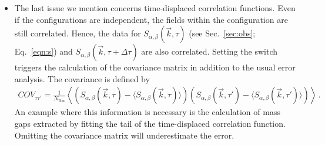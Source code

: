 \begin{itemize}
	\item The last issue we mention concerns time-displaced correlation functions. Even if the configurations are independent, the fields within the configuration are still correlated. Hence, the data for $S_{\alpha,\beta}(\vec{k},\tau)$ (see Sec.~\ref{sec:obs}; Eq.~\eqref{eqn:s}) and $S_{\alpha,\beta}(\vec{k},\tau+\Delta\tau)$ are also correlated. Setting the switch  triggers the calculation of the covariance matrix in addition to the usual error analysis. The covariance is defined by
	\begin{align}
		COV_{\tau\tau'}=\frac{1}{N_{\text{Bin}}}\left\langle
		\left( S_{\alpha,\beta}(\vec{k},\tau) - \big\langle S_{\alpha,\beta}(\vec{k},\tau)\big\rangle \right)
		\left(S_{\alpha,\beta}(\vec{k},\tau')-\big\langle S_{\alpha,\beta}(\vec{k},\tau')\big\rangle \right)  \right\rangle\,.
	\end{align}
An example where this information is necessary is the  calculation of mass gaps extracted by fitting the  tail  of the time-displaced correlation function.  Omitting  the covariance matrix will  underestimate the  error.
\end{itemize}


%
